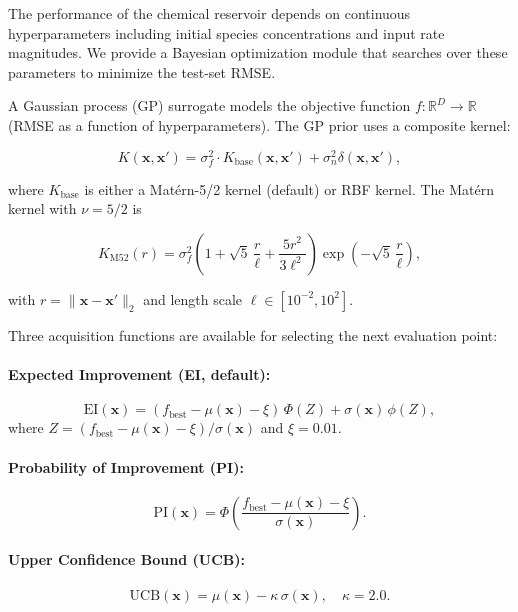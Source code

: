 \documentclass[11pt,twocolumn]{article}
\newcommand{\R}{\mathbb{R}}
\newcommand{\bx}{\mathbf{x}}
\begin{document}
The performance of the chemical reservoir depends on continuous
hyperparameters including initial species concentrations and input rate
magnitudes.  We provide a Bayesian optimization module that searches over
these parameters to minimize the test-set RMSE.

A Gaussian process (GP) surrogate models the objective function
$f: \R^D \to \R$ (RMSE as a function of hyperparameters).  The GP prior uses
a composite kernel:

\begin{equation}
  K(\bx, \bx') = \sigma_f^2 \cdot K_\text{base}(\bx, \bx') + \sigma_n^2 \delta(\bx, \bx'),
\end{equation}

where $K_\text{base}$ is either a Mat\'{e}rn-5/2 kernel (default) or RBF
kernel.  The Mat\'{e}rn kernel with $\nu = 5/2$ is

\begin{equation}
  K_{\text{M52}}(r) = \sigma_f^2\!\left(1 + \sqrt{5}\,\frac{r}{\ell} + \frac{5r^2}{3\ell^2}\right)\!\exp\!\left(-\sqrt{5}\,\frac{r}{\ell}\right),
\end{equation}

with $r = \|\bx - \bx'\|_2$ and length scale
$\ell \in [10^{-2}, 10^2]$.

Three acquisition functions are available for selecting the next evaluation
point:

\paragraph{Expected Improvement (EI, default):}
\begin{equation}
  \text{EI}(\bx) = (f_\text{best} - \mu(\bx) - \xi)\,\Phi(Z) + \sigma(\bx)\,\phi(Z),
\end{equation}
where $Z = (f_\text{best} - \mu(\bx) - \xi)/\sigma(\bx)$ and $\xi = 0.01$.

\paragraph{Probability of Improvement (PI):}
\begin{equation}
  \text{PI}(\bx) = \Phi\!\left(\frac{f_\text{best} - \mu(\bx) - \xi}{\sigma(\bx)}\right).
\end{equation}

\paragraph{Upper Confidence Bound (UCB):}
\begin{equation}
  \text{UCB}(\bx) = \mu(\bx) - \kappa\,\sigma(\bx), \quad \kappa = 2.0.
\end{equation}
\end{document}
